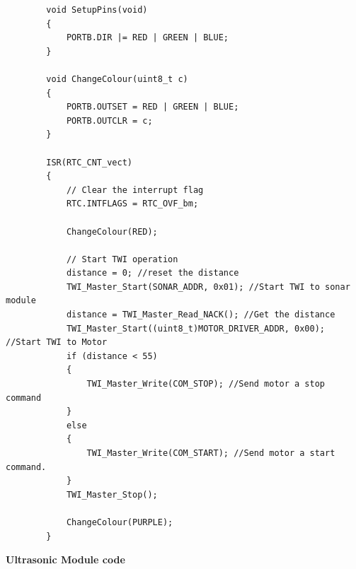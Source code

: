\documentclass[11pt,a4paper,titlepage]{report}
\begin{document}
\begin{lstlisting}
		void SetupPins(void)
		{
			PORTB.DIR |= RED | GREEN | BLUE;
		}
		
		void ChangeColour(uint8_t c)
		{
			PORTB.OUTSET = RED | GREEN | BLUE;
			PORTB.OUTCLR = c;
		}
		
		ISR(RTC_CNT_vect)
		{
			// Clear the interrupt flag
			RTC.INTFLAGS = RTC_OVF_bm; 
			
			ChangeColour(RED);
			
			// Start TWI operation
			distance = 0; //reset the distance
			TWI_Master_Start(SONAR_ADDR, 0x01); //Start TWI to sonar module 
			distance = TWI_Master_Read_NACK(); //Get the distance
			TWI_Master_Start((uint8_t)MOTOR_DRIVER_ADDR, 0x00); //Start TWI to Motor
			if (distance < 55)
			{
				TWI_Master_Write(COM_STOP); //Send motor a stop command
			}
			else
			{
				TWI_Master_Write(COM_START); //Send motor a start command. 
			}
			TWI_Master_Stop();
			
			ChangeColour(PURPLE);
		}
	\end{lstlisting}
	\newpage
	\label{code:ultrasonic}
	\textbf{Ultrasonic Module code}
\end{document}
